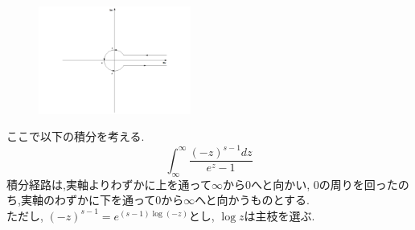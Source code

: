 \begin{figure}
\begin{center}
\includegraphics[width=50mm]{zetamura2.pdf}
\end{center}
\end{figure}
ここで以下の積分を考える.
\[
\int_{\infty}^{\infty} \frac{(-z)^{s-1}dz}{e^z-1}
\]
積分経路は,実軸よりわずかに上を通って$\infty$から0へと向かい, 0の周りを回ったのち,実軸のわずかに下を通って0から$\infty$へと向かうものとする.\\
ただし, $(-z)^{s-1}=e^{(s-1)\log(-z)}$とし, $\log z$は主枝を選ぶ.\\

